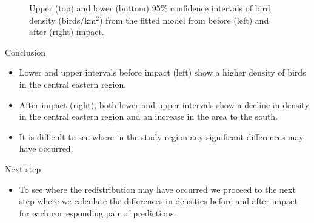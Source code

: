 \documentclass[11pt, a4paper]{article}
\begin{document}
\begin{figure}[h!]
  \centering
  \hfill
  \caption{Upper (top) and lower (bottom) 95\% confidence intervals of bird density (birds/km$^2$) from the fitted model from before (left) and after (right) impact.}
  \label{fig:cis}
\end{figure}

\begin{block}{Conclusion}
\begin{itemize}
  \item Lower and upper intervals before impact (left) show a higher density of birds in the central eastern region.  
  \item After impact (right), both lower and upper intervals show a decline in density in the central eastern region and an increase in the area to the south.  
  \item It is difficult to see where in the study region any significant differences may have occurred.
\end{itemize}
\end{block}

\begin{block}{Next step}
\begin{itemize}
\item{To see where the redistribution may have occurred we proceed to the next step where we calculate the differences in densities before and after impact for each corresponding pair of predictions. }
\end{itemize}
\end{block}
\end{document}
